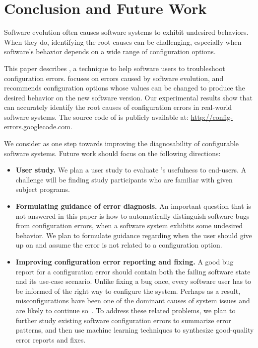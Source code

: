 \section{Conclusion and Future Work}
\label{sec:conclusion}

Software evolution often causes software systems to
exhibit undesired behaviors.
When they do, identifying the root causes
can be challenging, especially when software's
behavior depends on a wide range of configuration options.

This paper describes \ourtool, a technique to help software
users to troubleshoot configuration errors. \ourtool
focuses on errors caused by software evolution, and
recommends configuration options whose values can be changed to
produce the desired behavior on the new software version.
Our experimental results show that \ourtool
can accurately identify the root causes of
\errornum configuration errors in \subjnum real-world software systems.
The source code of \ourtool is publicly available
at: \url{http://config-errors.googlecode.com}.

We consider \ourtool as one step towards improving
the diagnosability of configurable software systems.
Future work should focus on the following directions:

\vspace{-2mm}

\begin{itemize}
\item \textbf{User study.} We plan a user study to evaluate
\ourtool's usefulness to end-users. A challenge
will be finding study participants who are familiar
with given subject programs.

\item \textbf{Formulating guidance of error diagnosis.}
An important question that is not answered in this paper
is how to automatically distinguish software bugs from 
configuration errors, when a software system exhibits
some undesired behavior. We plan to formulate guidance
regarding when the user should give up on \ourtool
and assume the error is not related to a configuration option.

\item \textbf{Improving configuration error reporting and fixing.}
A good bug report for a configuration error should contain both the
failing software state and its use-case scenario.
Unlike fixing a bug once,
every software user has to be informed of the right way to
configure the system. Perhaps as a result, misconfigurations
have been one of the dominant causes of system issues and
are likely to continue so~\cite{Yin:2011:ESC}. To address these related problems,
we plan to further study existing software configuration errors
to summarize error patterns, and then use machine learning
techniques to synthesize good-quality error reports and fixes.

\end{itemize}
